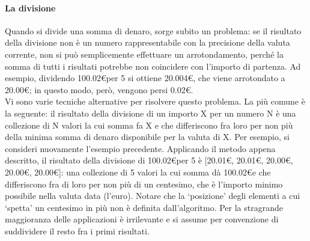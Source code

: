 \paragraph{La divisione}
Quando si divide una somma di denaro, sorge subito un problema: se il risultato della divisione non è un numero rappresentabile con la precisione della valuta corrente, non si può semplicemente effettuare un arrotondamento, perché la somma di tutti i risultati potrebbe non coincidere con l'importo di partenza. Ad esempio, dividendo 100.02\euro  per 5 si ottiene 20.004\euro , che viene arrotondato a 20.00\euro ; in questo modo, però, vengono persi 0.02\euro . \\
Vi sono varie tecniche alternative per risolvere questo problema. La più comune è la seguente: il risultato della divisione di un importo X per un numero N è una collezione di N valori la cui somma fa X e che differiscono fra loro per non più della minima somma di denaro disponibile per la valuta di X. Per esempio, si consideri nuovamente l'esempio precedente. Applicando il metodo appena descritto, il risultato della divisione di 100.02\euro  per 5 è [20.01\euro , 20.01\euro , 20.00\euro , 20.00\euro , 20.00\euro ]: una collezione di 5 valori la cui somma dà 100.02\euro  e che differiscono fra di loro per non più di un centesimo, che è l'importo minimo possibile nella valuta data (l'euro). Notare che la \textquoteleft posizione\textquoteright{} degli elementi a cui \textquoteleft spetta\textquoteright{} un centesimo in più non è definita dall'algoritmo. Per la stragrande maggioranza delle applicazioni è irrilevante e si assume per convenzione di suddividere il resto fra i primi risultati.